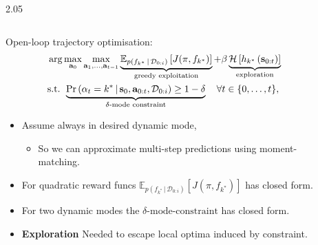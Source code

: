 \documentclass[final,11pt]{beamer}
\newlength{\sepwidth}
\newlength{\colwidth}
\newcommand{\separatorcolumn}{\begin{column}{\sepwidth}\end{column}}
\newcommand{\E}{\mathbb{E}}    %
\renewcommand{\mid}{\,|\,}
\DeclareMathOperator{\E}{\mathbb{E}}
\newcommand{\modeInd}{\ensuremath{k}}
\newcommand{\modeDesInd}{\ensuremath{\text{des}}}
\newcommand{\modeDes}[1]{\ensuremath{#1^{\modeDesInd}}}
\newcommand{\state}{\ensuremath{\mathbf{x}}}
\newcommand{\control}{\ensuremath{\mathbf{u}}}
\newcommand{\dataset}{\ensuremath{\mathcal{D}}}
\newcommand{\modeVar}{\ensuremath{\alpha}}
\newcommand{\gatingFunc}{\ensuremath{h}}
\newcommand{\timeInd}{\ensuremath{t}}
\newcommand{\TimeInd}{\ensuremath{\MakeUppercase{\timeInd}}}
\newcommand{\dynamicsFunc}{\ensuremath{f}}
\newcommand{\stateTraj}{\ensuremath{\bar{\state}}}
\newcommand{\desiredMode}{\ensuremath{\modeInd^{*}}}
\renewcommand{\modeDes}[1]{\ensuremath{#1_{\desiredMode}}}
\newcommand{\desiredGatingFunction}{\ensuremath{\modeDes{\gatingFunc}}}
\renewcommand{\state}{\ensuremath{\mathbf{s}}}
\renewcommand{\dataset}{\ensuremath{\mathcal{D}}}
\renewcommand{\control}{\ensuremath{\mathbf{a}}}
\newcommand{\action}{\ensuremath{\control}}
\renewcommand{\action}{\ensuremath{\mathbf{a}}}
\begin{document}
\begin{frame}[t]
\begin{columns}[t]
\begin{column}{2.05\colwidth}
\begin{columns}[t]
\begin{column}{\colwidth}
  Open-loop trajectory optimisation:
  \begin{subequations} \label{eq-trajectory-optimisation}
  \begin{align}
  &\arg\max_{\action_{0}}\max_{\action_{1}, \ldots, \action_{\TimeInd-1}}
  \underbrace{\E_{p(\dynamicsFunc_{\desiredMode} \mid \dataset_{0:i})} \left[ J(\pi, \dynamicsFunc_{\desiredMode}) \right]}_{\text{greedy exploitation}}
  + \beta \underbrace{ \mathcal{H} \left[ \gatingFunc_{\desiredMode} \left( \state_{0:\TimeInd} \right) \right]}_{\text{exploration}} \\
  &\text{s.t. } \underbrace{ \Pr \left(\modeVar_{\timeInd} = \desiredMode \mid \state_{0}, \action_{0:t}, \mathcal{D}_{0:i} \right)
  \geq 1-\delta}_{\delta\text{-mode constraint}} \quad \forall \timeInd \in \{0,\ldots, \TimeInd\}, \label{eq-constraint-approx}
  \end{align}
  \end{subequations}
  \begin{itemize}
  \item Assume always in desired dynamic mode,
    \begin{itemize}
      \item So we can approximate multi-step predictions using moment-matching.
    \end{itemize}
  \item For quadratic reward funcs $\E_{p(\dynamicsFunc_{\desiredMode} \mid \dataset_{0:i})} \left[ J(\pi, \dynamicsFunc_{\desiredMode}) \right]$ has closed form.
  \item For two dynamic modes the $\delta\text{-mode-constraint}$ has closed form.
  \item \textbf{Exploration} Needed to escape local optima induced by constraint.
  \end{itemize}


\end{column}

\separatorcolumn

\begin{column}{\colwidth}


\end{column}
\end{columns}
\end{column}
\end{columns}
\end{frame}
\end{document}
